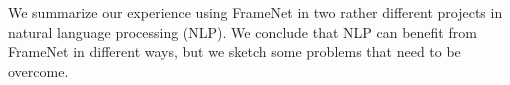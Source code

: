 We summarize our experience using FrameNet in two rather different projects in natural language processing (NLP).  We conclude that NLP can benefit from FrameNet in different ways, but we sketch some problems that need to be overcome.
